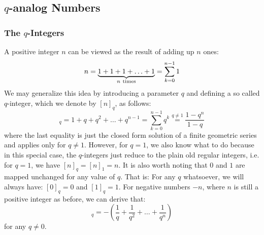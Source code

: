 




\subsection{$q$-analog Numbers}

\subsubsection{The $q$-Integers}
A positive integer $n$ can be viewed as the result of adding up $n$ ones:
\begin{equation}
n = \underbrace{1 + 1 + 1 + \ldots + 1}_{n\rm\ times} 
  = \sum_{k=0}^{n-1} 1
\end{equation}
We may generalize this idea by introducing a parameter $q$ and defining a so called $q$-integer, which we denote by $[n]_q$, as follows:
\begin{equation}
[n]_q = 1 + q + q^2 + \ldots + q^{n-1} 
      = \sum_{k=0}^{n-1} q^k
      \overset{q \neq 1}{=} \frac{1 - q^n}{1 - q}
\end{equation}
where the last equality is just the closed form solution of a finite geometric series and applies only for $q \neq 1$. However, for $q = 1$, we also know what to do because in this special case, the $q$-integers just reduce to the plain old regular integers, i.e. for $q=1$, we have $[n]_q = [n]_1 = n$. It is also worth noting that $0$ and $1$ are mapped unchanged for any value of $q$. That is: For any $q$ whatsoever, we will always have: $[0]_q = 0$ and $[1]_q = 1$. For negative numbers $-n$, where $n$ is still a positive integer as before, we can derive that:
\begin{equation}
[-n]_q = - \left( \frac{1}{q} + \frac{1}{q^2} + \ldots + \frac{1}{q^n}  \right)
\end{equation}
for any $q \neq 0$.

